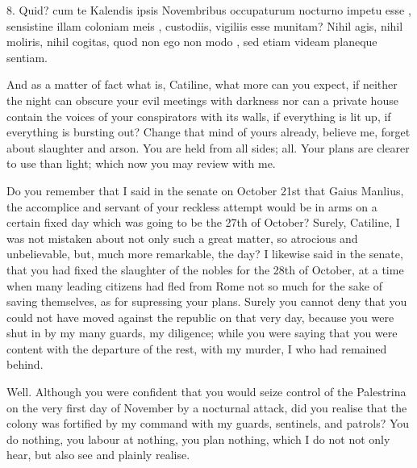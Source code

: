 {  8. Quid? cum te  Kalendis ipsis Novembribus occupaturum nocturno impetu esse , sensistine illam coloniam  meis , custodiis, vigiliis esse munitam? Nihil agis, nihil moliris, nihil cogitas, quod non ego non modo , sed etiam videam planeque sentiam.
}{
  And as a matter of fact what is, Catiline, what more can you expect, if neither the night can obscure your evil meetings with darkness nor can a private house contain the voices of your conspirators with its walls, if everything is lit up, if everything is bursting out? Change that mind of yours already, believe me, forget about slaughter and arson. You are held from all sides; all. Your plans are clearer to use than light; which now you may review with me.

  Do you remember that I said in the senate on October 21st that Gaius Manlius, the accomplice and servant of your reckless attempt would be in arms on a certain fixed day which was going to be the 27th of October? Surely, Catiline, I was not mistaken about not only such a great matter, so atrocious and unbelievable, but, much more remarkable, the day? I likewise said in the senate, that you had fixed the slaughter of the nobles for the 28th of October, at a time when many leading citizens had fled from Rome not so much for the sake of saving themselves, as for supressing your plans. Surely you cannot deny that you could not have moved against the republic on that very day, because you were shut in by my many guards, my diligence; while you were saying that you were content with the departure of the rest, with my murder, I who had remained behind.

  Well. Although you were confident that you would seize control of the Palestrina on the very first day of November by a nocturnal attack, did you realise that the colony was fortified by my command with my guards, sentinels, and patrols? You do nothing, you labour at nothing, you plan nothing, which I do not not only hear, but also see and plainly realise.
}
